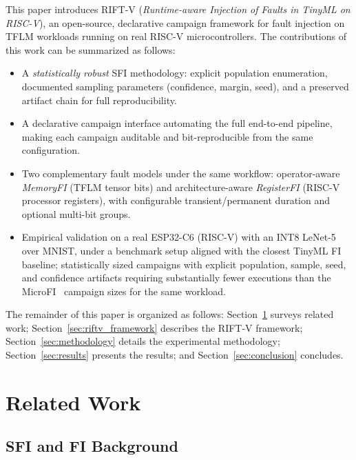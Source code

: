 \documentclass[conference]{IEEEtran}
\begin{document}
This paper introduces RIFT-V (\emph{Runtime-aware Injection of Faults in TinyML on RISC-V}), an open-source, declarative campaign framework for fault injection on TFLM workloads running on real RISC-V microcontrollers. The contributions of this work can be summarized as follows:
\begin{itemize}
    \item A \emph{statistically robust} SFI methodology: explicit population enumeration, documented sampling parameters (confidence, margin, seed), and a preserved artifact chain for full reproducibility.
    \item A declarative campaign interface automating the full end-to-end pipeline, making each campaign auditable and bit-reproducible from the same configuration.
    \item Two complementary fault models under the same workflow: operator-aware \emph{MemoryFI} (TFLM tensor bits) and architecture-aware \emph{RegisterFI} (RISC-V processor registers), with configurable transient/permanent duration and optional multi-bit groups.
    \item Empirical validation on a real ESP32-C6 (RISC-V) with an INT8 LeNet-5 over MNIST, under a benchmark setup aligned with the closest TinyML FI baseline; statistically sized campaigns with explicit population, sample, seed, and confidence artifacts requiring substantially fewer executions than the MicroFI~\cite{de2025MicroFI} campaign sizes for the same workload.
\end{itemize}
 
The remainder of this paper is organized as follows: Section~\ref{sec:related_work} surveys related work; Section~\ref{sec:riftv_framework} describes the RIFT-V framework; Section~\ref{sec:methodology} details the experimental methodology; Section~\ref{sec:results} presents the results; and Section~\ref{sec:conclusion} concludes.
 

\section{Related Work}
\label{sec:related_work}

\subsection{SFI and FI Background}
\label{subsec:related_sfi}
\end{document}
